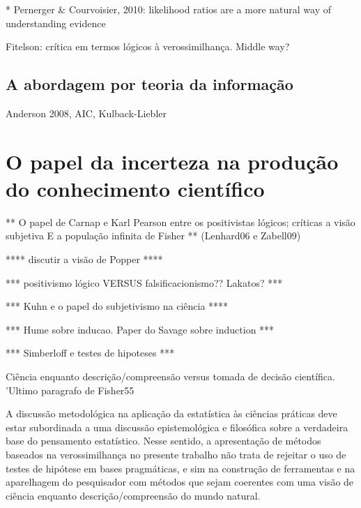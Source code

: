 * Pernerger \& Courvoisier, 2010: likelihood ratios are a more natural way of understanding evidence

Fitelson: crítica em termos lógicos à verossimilhança. Middle way?

\subsection{A abordagem por teoria da informação}

Anderson 2008, AIC, Kulback-Liebler

\section{O papel da incerteza na produção do conhecimento científico}

** O papel de Carnap e Karl Pearson entre os positivistas lógicos; críticas a visão subjetiva E a população infinita de Fisher **
(Lenhard06 e Zabell09)

**** discutir a visão de Popper ****

*** positivismo lógico VERSUS falsificacionismo?? Lakatos? ***

*** Kuhn e o papel do subjetivismo na ciência ****

*** Hume sobre inducao. Paper do Savage sobre induction ***

*** Simberloff e testes de hipoteses ***

Ciência enquanto descrição/compreensão versus tomada de decisão científica. 'Ultimo paragrafo de Fisher55

A discussão metodológica na aplicação da estatística às ciências práticas deve estar subordinada a uma discussão
epistemológica e filosófica sobre a verdadeira base do pensamento estatístico. Nesse sentido, a apresentação de
métodos baseados na verossimilhança no presente trabalho não trata de rejeitar o uso de testes de hipótese em
bases pragmáticas, e sim na construção de ferramentas e na aparelhagem do pesquisador com métodos que sejam
coerentes com uma visão de ciência enquanto descrição/compreensão do mundo natural.

